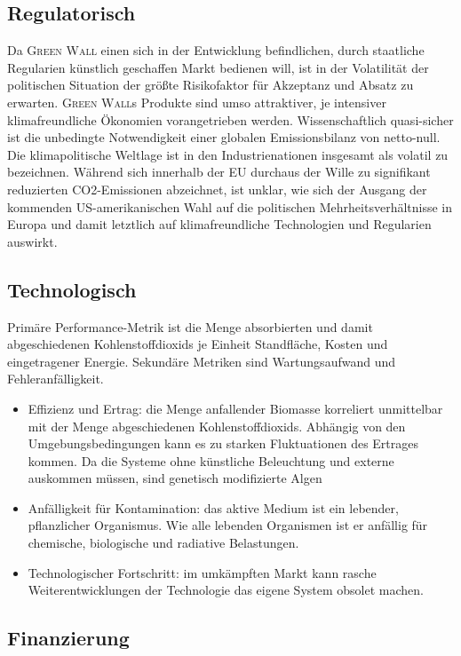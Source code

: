 \subsection{Regulatorisch}

Da \textsc{Green Wall} einen sich in der Entwicklung befindlichen, durch staatliche Regularien künstlich geschaffen Markt bedienen will, ist in der Volatilität der politischen Situation der größte Risikofaktor für Akzeptanz und Absatz zu erwarten.
\textsc{Green Wall}s Produkte sind umso attraktiver, je intensiver klimafreundliche Ökonomien vorangetrieben werden.
Wissenschaftlich quasi-sicher ist die unbedingte Notwendigkeit einer globalen Emissionsbilanz von netto-null.
Die klimapolitische Weltlage ist in den Industrienationen insgesamt als volatil zu bezeichnen.
Während sich innerhalb der EU durchaus der Wille zu signifikant reduzierten CO2-Emissionen abzeichnet, ist unklar, wie sich der Ausgang der kommenden US-amerikanischen Wahl auf die politischen Mehrheitsverhältnisse in Europa und damit letztlich auf klimafreundliche Technologien und Regularien auswirkt.

\subsection{Technologisch}

Primäre Performance-Metrik ist die Menge absorbierten und damit abgeschiedenen Kohlenstoffdioxids je Einheit Standfläche, Kosten und eingetragener Energie.
Sekundäre Metriken sind Wartungsaufwand und Fehleranfälligkeit.
\begin{itemize}
    \item Effizienz und Ertrag: die Menge anfallender Biomasse korreliert unmittelbar mit der Menge abgeschiedenen Kohlenstoffdioxids.
          Abhängig von den Umgebungsbedingungen kann es zu starken Fluktuationen des Ertrages kommen.
          Da die Systeme ohne künstliche Beleuchtung und externe  auskommen müssen, sind genetisch modifizierte Algen
    \item Anfälligkeit für Kontamination: das aktive Medium ist ein lebender, pflanzlicher Organismus. Wie alle lebenden Organismen ist er anfällig für chemische, biologische und radiative Belastungen.
    \item Technologischer Fortschritt: im umkämpften Markt kann rasche Weiterentwicklungen der Technologie das eigene System obsolet machen.
\end{itemize}

\subsection{Finanzierung}

